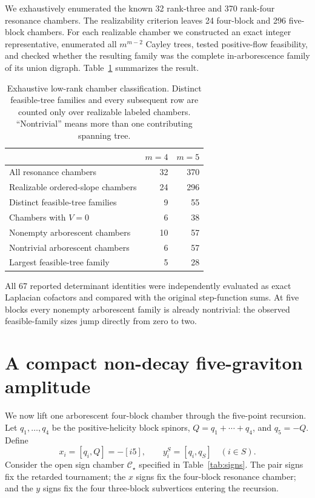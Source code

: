 \documentclass[11pt]{article}
\theoremstyle{definition}
\theoremstyle{remark}
\begin{document}
We exhaustively enumerated the known 32 rank-three and 370 rank-four
resonance chambers.  The realizability criterion leaves 24 four-block and 296
five-block chambers.  For each realizable chamber we constructed an exact integer
representative, enumerated all $m^{m-2}$ Cayley trees, tested positive-flow
feasibility, and checked whether the resulting family was the complete
in-arborescence family of its union digraph.  Table~\ref{tab:classification}
summarizes the result.

\begin{table}[ht]
\centering
\small
\begin{tabular}{@{}lrr@{}}
\toprule
 & $m=4$ & $m=5$\\
\midrule
All resonance chambers & 32 & 370\\
Realizable ordered-slope chambers & 24 & 296\\
Distinct feasible-tree families & 9 & 55\\
Chambers with $V=0$ & 6 & 38\\
Nonempty arborescent chambers & 10 & 57\\
Nontrivial arborescent chambers & 6 & 57\\
Largest feasible-tree family & 5 & 28\\
\bottomrule
\end{tabular}
\caption{Exhaustive low-rank chamber classification.  Distinct feasible-tree
families and every subsequent row are counted only over realizable labeled
chambers.  ``Nontrivial'' means more than one contributing spanning tree.}
\label{tab:classification}
\end{table}

All 67 reported determinant identities were independently evaluated as exact
Laplacian cofactors and compared with the original step-function sums.
At five blocks every nonempty arborescent family is already nontrivial: the
observed feasible-family sizes jump directly from zero to two.

\section{A compact non-decay five-graviton amplitude}

We now lift one arborescent four-block chamber through the five-point recursion.
Let $q_1,\ldots,q_4$ be the positive-helicity block spinors,
$Q=q_1+\cdots+q_4$, and $q_5=-Q$.  Define
\begin{equation}
  x_i=[q_i,Q]=-[i5],
  \qquad
  y_i^{S}=[q_i,q_S]\quad(i\in S).
\end{equation}
Consider the open sign chamber $\mathcal C_\star$ specified in
Table~\ref{tab:signs}.  The pair signs fix the retarded tournament; the $x$
signs fix the four-block resonance chamber; and the $y$ signs fix the four
three-block subvertices entering the recursion.
\end{document}
